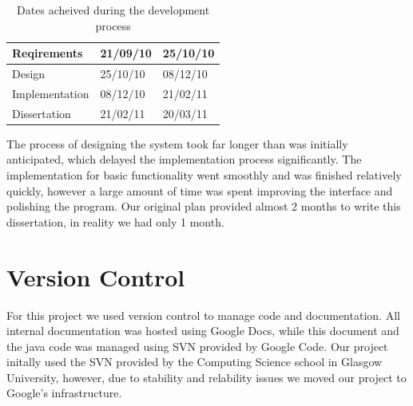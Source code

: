 \begin{table}[!h]
\begin{center}
\caption{Dates acheived during the development process}
\begin{tabular}{ | p{4cm} |p{4cm}  |p{4cm} | }
    \hline
    Reqirements & 21/09/10 & 25/10/10 \\
    \hline
    Design & 25/10/10 & 08/12/10 \\
    \hline
    Implementation & 08/12/10 & 21/02/11 \\
    \hline
    Dissertation & 21/02/11 & 20/03/11 \\
    \hline
\end{tabular}
\end{center}
\end{table}

The process of designing the system took far longer than was initially anticipated, which delayed the implementation process significantly. The implementation for basic functionality went smoothly and was finished relatively quickly, however a large amount of time was spent improving the interface and polishing the program. Our original plan provided almost 2 months to write this dissertation, in reality we had only 1 month.  

\section{Version Control}

For this project we used version control to manage code and documentation. All internal documentation was hosted using Google Docs, while this document and the java code was managed using SVN provided by Google Code. Our project initally used the SVN provided by the Computing Science school in Glasgow University, however, due to stability and relability issues we moved our project to Google's infrastructure.
